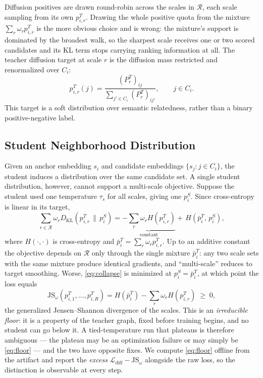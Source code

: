 Diffusion positives are drawn round-robin across the scales in $\mathcal{R}$, each scale sampling from its own $p_{i,r}^T$. Drawing the whole positive quota from the mixture $\sum_r\omega_r p_{i,r}^T$ is the more obvious choice and is wrong: the mixture's support is dominated by the broadest walk, so the sharpest scale receives one or two scored candidates and its KL term stops carrying ranking information at all. The teacher diffusion target at scale $r$ is the diffusion mass restricted and renormalized over $C_i$:
\begin{equation}
    p_{i,r}^{T}(j)
    =
    \frac{(P_r^T)_{ij}}
    {\sum_{j' \in C_i}(P_r^T)_{ij'}},
    \qquad j\in C_i.
\end{equation}
This target is a soft distribution over semantic relatedness, rather than a binary positive-negative label.

\subsection{Student Neighborhood Distribution}

Given an anchor embedding $s_i$ and candidate embeddings $\{s_j:j\in C_i\}$, the student induces a distribution over the same candidate set. A single student distribution, however, cannot support a multi-scale objective. Suppose the student used one temperature $\tau_s$ for all scales, giving one $p_i^S$. Since cross-entropy is linear in its target,
\begin{equation}
    \sum_{r\in\mathcal{R}}\omega_r D_{\mathrm{KL}}\!\left(p_{i,r}^{T}\,\|\,p_i^{S}\right)
    =
    \underbrace{-\sum_{r}\omega_r H\!\left(p_{i,r}^{T}\right)}_{\text{constant}}
    +\,
    H\!\left(\bar p_i^{T},\,p_i^{S}\right),
    \label{eq:collapse}
\end{equation}
where $H(\cdot,\cdot)$ is cross-entropy and $\bar p_i^{T}=\sum_{r}\omega_r p_{i,r}^{T}$. Up to an additive constant the objective depends on $\mathcal{R}$ only through the single mixture $\bar p_i^T$: any two scale sets with the same mixture produce identical gradients, and ``multi-scale'' reduces to target smoothing. Worse, \eqref{eq:collapse} is minimized at $p_i^S=\bar p_i^T$, at which point the loss equals
\begin{equation}
    \mathrm{JS}_{\omega}\!\left(p_{i,1}^{T},\dots,p_{i,R}^{T}\right)
    =
    H\!\left(\bar p_i^{T}\right)-\sum_{r}\omega_r H\!\left(p_{i,r}^{T}\right)
    \;\ge\;0,
    \label{eq:floor}
\end{equation}
the generalized Jensen--Shannon divergence of the scales. This is an \emph{irreducible floor}: it is a property of the teacher graph, fixed before training begins, and no student can go below it. A tied-temperature run that plateaus is therefore ambiguous --- the plateau may be an optimization failure or may simply be \eqref{eq:floor} --- and the two have opposite fixes. We compute \eqref{eq:floor} offline from the artifact and report the \emph{excess} $\mathcal{L}_{\mathrm{diff}}-\mathrm{JS}_\omega$ alongside the raw loss, so the distinction is observable at every step.

